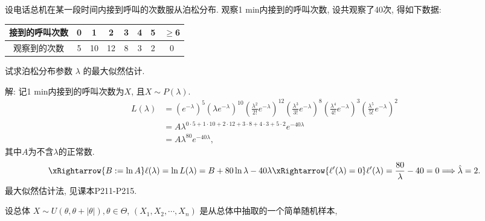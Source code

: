 \documentclass[standard]{ExBook}
\renewenvironment{shaded}{%
  \def\FrameCommand{\fboxsep=\FrameSep \colorbox{shadecolor}}%
  \MakeFramed{\advance\hsize-\width \FrameRestore}%
}{%
  \endMakeFramed
}
\begin{document}
\begin{qitems}
\vspace{2.5cm-5em}

    \begin{bbox}
    \begin{shaded}
        \qitem
设电话总机在某一段时间内接到呼叫的次数服从泊松分布. 观察1 min内接到的呼叫次数, 设共观察了40次, 得如下数据:

\begin{center}
\setlength{\tabcolsep}{20pt}
\begin{tabular}{c|ccccccc}
\hline
接到的呼叫次数 & 0 & 1 & 2 & 3 & 4 & 5 & \(\geq\)6 \\
\hline
观察到的次数 & 5 & 10 & 12 & 8 & 3 & 2 & 0 \\
\hline
\end{tabular}
\end{center}

试求泊松分布参数 \(\lambda\) 的最大似然估计.
    \end{shaded}
    \end{bbox}

\vspace{\dimexpr2.5cm-5em\relax}

解: 记1 min内接到的呼叫次数为$X$, 且$X\sim P(\lambda)$.
$$
\begin{aligned}
L(\lambda)
&=\left(e^{-\lambda}\right)^5
\left(\lambda e^{-\lambda}\right)^{10}
\left(\frac{\lambda^2}{2!}e^{-\lambda}\right)^{12}
\left(\frac{\lambda^3}{3!}e^{-\lambda}\right)^8
\left(\frac{\lambda^4}{4!}e^{-\lambda}\right)^3
\left(\frac{\lambda^5}{5!}e^{-\lambda}\right)^2\\
&=A\lambda^{0\cdot5+1\cdot10+2\cdot12+3\cdot8+4\cdot3+5\cdot2}e^{-40\lambda}\\
&=A\lambda^{80}e^{-40\lambda},
\end{aligned}
$$
其中$A$为不含$\lambda$的正常数.
$$
\xRightarrow{B:=\ln A}
\ell(\lambda)=\ln L(\lambda)
=B+80\ln\lambda-40\lambda
\xRightarrow{\ell'(\lambda)=0}
\ell'(\lambda)=\frac{80}{\lambda}-40=0
\Longrightarrow
\hat{\lambda}=2.
$$
\textcolor{themeColor}{\selectfont {} 最大似然估计法, 见课本P211-P215.}

\vspace{2.5cm-5em}

    \begin{bbox}
    \begin{shaded}
        \qitem
设总体 \(X \sim U(\theta, \theta + |\theta|), \theta \in \Theta\), \((X_1, X_2, \cdots, X_n)\) 是从总体中抽取的一个简单随机样本,


\end{shaded}
\end{bbox}
\end{qitems}
\end{document}
